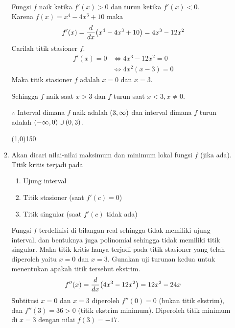 \begin{enumerate}[leftmargin=*, label={\arabic*}.]
\begin{enumerate}[label={\alph*}.]
    Fungsi $f$ naik ketika $f'(x) > 0$ dan turun ketika $f'(x) < 0$.\\
    Karena $f(x)=x^{4}-4x^{3}+10$ maka
    \[
    f'(x) = \drv{x}{x^{4}-4x^{3}+10} = 4x^{3}-12x^{2}
    \]
    Carilah titik stasioner $f$.
    \begin{align*}
        f'(x)=0 &\iff 4x^{3}-12x^{2}=0\\
        &\iff 4x^{2}(x-3) = 0
    \end{align*}
    Maka titik stasioner $f$ adalah $x=0$ dan $x=3$.
    \begin{center}
    \end{center}
    Sehingga $f$ naik saat $x > 3$ dan $f$ turun saat $x < 3, x\neq 0$.

    $\therefore$ Interval dimana $f$ naik adalah $(3, \infty)$ dan interval dimana 
    $f$ turun adalah $(-\infty,0)\cup(0,3)$.
\begin{center}
    \line(1,0){150}
\end{center}
    \item Akan dicari nilai-nilai maksimum dan minimum lokal fungsi $f$ (jika ada).\\
    Titik kritis terjadi pada
    \begin{enumerate}[label={\arabic*})]
        \item Ujung interval
        \item Titik stasioner (saat $f'(c)=0$)
        \item Titik singular (saat $f'(c)$ tidak ada)
    \end{enumerate}
    Fungsi $f$ terdefinisi di bilangan real sehingga tidak memiliki ujung interval, dan bentuknya 
    juga polinomial sehingga tidak memiliki titik singular. Maka titik kritis hanya terjadi pada 
    titik stasioner yang telah diperoleh yaitu $x=0$ dan $x=3$. Gunakan uji turunan kedua 
    untuk menentukan apakah titik tersebut ekstrim.
    \[
        f''(x) = \drv{x}{4x^{3}-12x^{2}} = 12x^{2}-24x
    \]
    Subtitusi $x = 0$ dan $x = 3$ diperoleh $f''(0) = 0$ (bukan titik ekstrim), dan 
    $f''(3) = 36 > 0$ (titik ekstrim minimum). Diperoleh titik minimum di $x=3$ dengan nilai 
    $f(3) = -17$.


\end{enumerate}
\end{enumerate}
